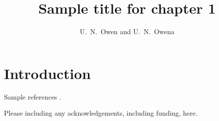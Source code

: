 \graphicspath{{chapters/chp1/graphics/}}

\title{Sample title for chapter 1}

\author{U.~N.~Owen and U.~N.~Owena}


\maketitle

\abstract{}
\lipsum[1]


\section*{Introduction}

Sample references \cite{alnaes2015fenics, baratta2023dolfinx}.

\begin{acknowledgement}
  Please including any acknowledgements, including funding, here.        
\end{acknowledgement}





